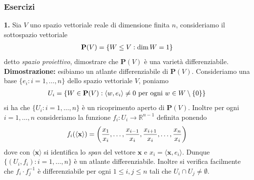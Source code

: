 \documentclass{article}
\begin{document}
\subsubsection{Esercizi}
\textbf{1.} Sia $V$ uno spazio vettoriale reale di dimensione finita $n$, consideriamo il sottospazio vettoriale
\begin{gather}
    \mathbf{P}(V) = \{ W \leq V : \dim W = 1 \} \notag
\end{gather}
detto \textit{spazio proiettivo}, dimostrare che $\mathbf{P}(V)$ è una varietà differenziabile. \\

\textbf{Dimostrazione:} esibiamo un atlante differenziabile di $\mathbf{P}(V)$. Consideriamo una base $\{ e_i : i = 1, \dots, n \}$ dello spazio vettoriale $V$, poniamo
\begin{gather}
    U_i = \{ W \in \mathbf{P}(V) : \langle w, e_i \rangle \neq 0 \text{ per ogni } w \in W \setminus \{ 0 \} \} \notag
\end{gather}
si ha che $\{ U_i : i = 1, \dots, n \}$ è un ricoprimento aperto di $\mathbf{P}(V)$. Inoltre per ogni $i = 1, \dots, n$ consideriamo la funzione $f_i : U_i \longrightarrow \mathbb{R}^{n - 1}$ definita ponendo
\begin{gather}
    f_i(\langle \mathbf{x} \rangle) = \left( \frac{x_1}{x_i}, \dots, \frac{x_{i - 1}}{x_i}, \frac{x_{i + 1}}{x_i}, \dots, \frac{x_n}{x_i} \right) \notag
\end{gather}
dove con $\langle \mathbf{x} \rangle$ si identifica lo \textit{span} del vettore $\mathbf{x}$ e $x_i = \langle \mathbf{x}, e_i \rangle$. Dunque $\{ (U_i, f_i) : i = 1, \dots, n \}$ è un atlante differenziabile. Inoltre si verifica facilmente che $f_i \cdot f_j^{-1}$ è differenziabile per ogni $1 \leq i, j \leq n$ tali che $U_i \cap U_j \neq \emptyset$.

\newpage
\end{document}
